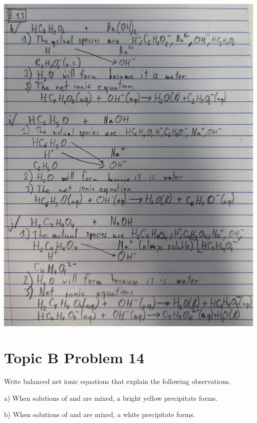 \documentclass[10pt]{article}
\begin{document}
\begin{center}
                \includegraphics[width=\textwidth, trim={0in 0in 0in 2in},clip]{Answers Images/Scan Sep 1, 2025 at 18.06.jpg}
            \end{center}

    \pagebreak
    \section{Topic B Problem 14}
        Write balanced net ionic equations that explain the following observations.
        
        a) When solutions of  and  are mixed, a bright yellow precipitate forms.
        
        b) When solutions of  and  are mixed, a white precipitate forms.
\end{document}
